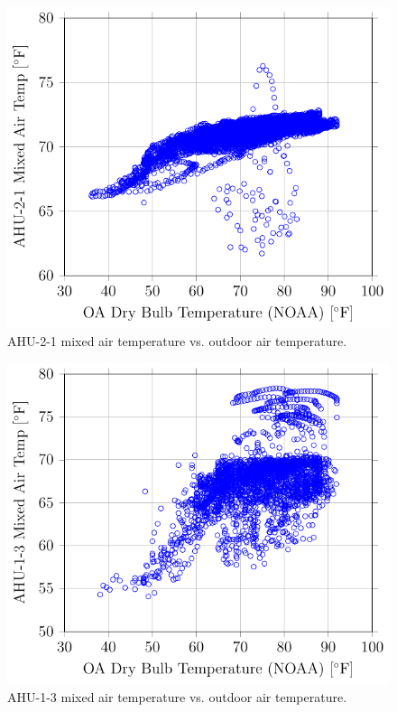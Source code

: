 \begin{figure}
\centering
\includegraphics[]{Plots/2016-06-13-1441-AHU21MixedAirTempvsOADryBulbTemperatureNOAA.pdf}
\caption{AHU-2-1 mixed air temperature vs. outdoor air temperature.}
\label{fig:AHU21MixedAirTempvsOADryBulbTemperatureNOAA}
\end{figure}


\begin{figure}
\centering
\includegraphics[]{Plots/2016-06-13-1459-AHU13MixedAirTempvsOADryBulbTemperatureNOAA.pdf}
\caption{AHU-1-3 mixed air temperature vs. outdoor air temperature.}
\label{fig:AHU13MixedAirTempvsOADryBulbTemperatureNOAA}
\end{figure}


